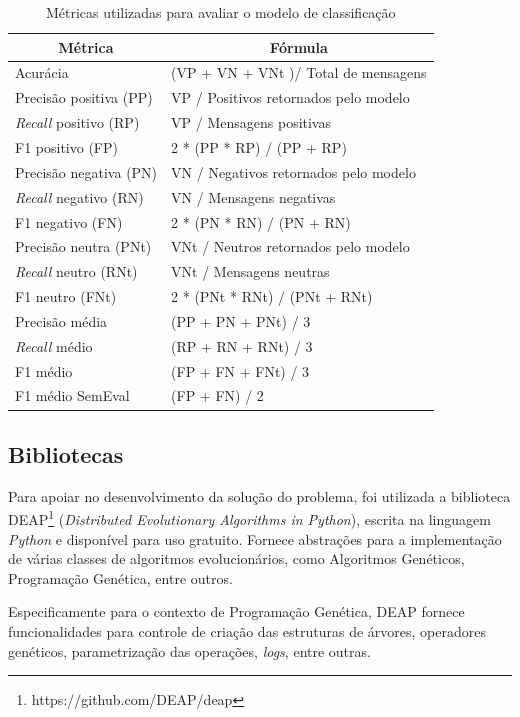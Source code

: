 \documentclass[12pt]{article}
\begin{document}
\begin{table}[H]
\centering
	\begin{tabular}{ll}
	\multicolumn{1}{c}{\textbf{Métrica}} & \multicolumn{1}{c}{\textbf{Fórmula}} \\ \hline
	Acurácia & (VP + VN + VNt )/ Total de mensagens \\ \hline
	Precisão positiva (PP) & VP / Positivos retornados pelo modelo \\ \hline
	\textit{Recall} positivo (RP) & VP / Mensagens positivas \\ \hline
	F1 positivo (FP) & 2 * (PP * RP) / (PP + RP) \\ \hline
	Precisão negativa (PN) & VN / Negativos retornados pelo modelo \\ \hline
	\textit{Recall} negativo (RN) & VN / Mensagens negativas \\ \hline
	F1 negativo (FN) & 2 * (PN * RN) / (PN + RN) \\ \hline
	Precisão neutra (PNt) & VNt / Neutros retornados pelo modelo \\ \hline
	\textit{Recall} neutro (RNt) & VNt / Mensagens neutras \\ \hline
	F1 neutro (FNt) & 2 * (PNt * RNt) / (PNt + RNt) \\ \hline
	Precisão média & (PP + PN + PNt) / 3 \\ \hline
	\emph{Recall} médio & (RP + RN + RNt) / 3 \\ \hline	
	F1 médio & (FP + FN + FNt) / 3 \\ \hline
	F1 médio SemEval & (FP + FN) / 2 \\ \hline	
	\end{tabular}
	\caption{Métricas utilizadas para avaliar o modelo de classificação}
	\label{metrics}
\end{table}

\subsection{Bibliotecas}

Para apoiar no desenvolvimento da solução do problema, foi utilizada a biblioteca DEAP\footnote{https://github.com/DEAP/deap} (\emph{Distributed Evolutionary Algorithms in Python}), escrita na linguagem \emph{Python} e disponível para uso gratuito. Fornece abstrações para a implementação de várias classes de algoritmos evolucionários, como Algoritmos Genéticos, Programação Genética, entre outros. \cite{DEAP_JMLR2012}

Especificamente para o contexto de Programação Genética, DEAP fornece funcionalidades para controle de criação das estruturas de árvores, operadores genéticos, parametrização das operações, \emph{logs}, entre outras.
\end{document}
